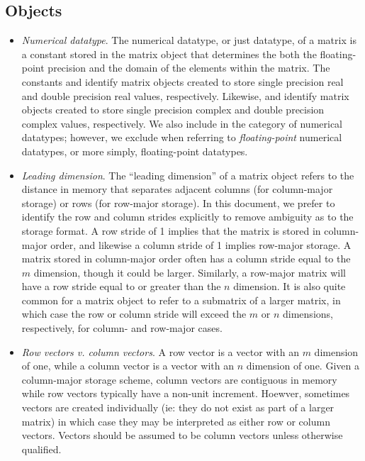 \subsection{Objects}


\begin{itemize}

\item
{\em Numerical datatype}.
The numerical datatype, or just datatype, of a matrix is a constant stored in
the matrix object that determines the both the floating-point precision and the
domain of the elements within the matrix.
The constants \flafloat and \fladouble identify matrix objects created to
store single precision real and double precision real values, respectively.
Likewise, \flacomplex and \fladoublecomplex identify matrix objects created
to store single precision complex and double precision complex values,
respectively.
We also include \flaint in the category of numerical datatypes; however,
we exclude \flaint when referring to {\em floating-point} numerical datatypes,
or more simply, floating-point datatypes.

\item
{\em Leading dimension}.
The ``leading dimension'' of a matrix object refers to the distance in memory
that separates adjacent columns (for column-major storage) or rows (for
row-major storage).
In this document, we prefer to identify the row and column strides explicitly
to remove ambiguity as to the storage format.
A row stride of 1 implies that the matrix is stored in column-major order,
and likewise a column stride of 1 implies row-major storage.
A matrix stored in column-major order often has a column stride equal to
the $ m $ dimension, though it could be larger.
Similarly, a row-major matrix will have a row stride equal to or greater than
the $ n $ dimension.
It is also quite common for a matrix object to refer to a submatrix
of a larger matrix, in which case the row or column stride will exceed the
$ m $ or $ n $ dimensions, respectively, for column- and row-major cases.

\item
{\em Row vectors v. column vectors}.
A row vector is a vector with an $ m $ dimension of one, while a column
vector is a vector with an $ n $ dimension of one.
Given a column-major storage scheme, column vectors are contiguous in
memory while row vectors typically have a non-unit increment.
Hoewver, sometimes vectors are created individually (ie: they do not
exist as part of a larger matrix) in which case
they may be interpreted as either row or column vectors.
Vectors should be assumed to be column vectors unless otherwise qualified.


\end{itemize}
